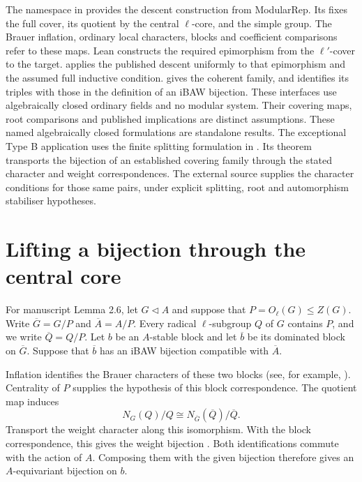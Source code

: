 \begin{implementation}
The  namespace in 
provides the descent construction from ModularRep. Its
 fixes the full cover, its quotient by the
central $\ell$-core, and the simple group. The Brauer inflation,
ordinary local characters, blocks and coefficient
comparisons refer to these maps. Lean constructs the required
epimorphism from the $\ell'$-cover to the target.
 applies the published
descent uniformly to that epimorphism and the assumed full
inductive condition.  gives the
coherent family, and  identifies its
triples with those in the definition of an iBAW bijection. These
interfaces use algebraically closed ordinary fields and no
modular system. Their covering maps, root comparisons and
published implications are distinct assumptions.
These named algebraically closed formulations are standalone results.
The exceptional Type B application uses the finite splitting formulation
in .
Its theorem  transports the bijection
of an established covering family through the stated character and
weight correspondences. The external source supplies the character
conditions for those same pairs, under explicit splitting, root and
automorphism stabiliser hypotheses.
\end{implementation}

\section{Lifting a bijection through the central core}

For manuscript Lemma 2.6, let $G\lhd A$ and suppose that
$P=O_\ell(G)\leq Z(G)$. Write $\overline G=G/P$ and
$\overline A=A/P$. Every radical $\ell$-subgroup $Q$ of $G$
contains $P$, and we write $\overline Q=Q/P$.
Let $b$ be an $A$-stable block and let $\overline b$ be its dominated
block on $\overline G$. Suppose that $\overline b$ has an iBAW
bijection compatible with $\overline A$.

Inflation identifies the Brauer characters of these two blocks
(see, for example, \cite[Theorem~9.10]{Navarro1998}). Centrality of $P$ supplies the
hypothesis of this block correspondence. The quotient map induces
\[
 N_G(Q)/Q\cong N_{\overline G}(\overline Q)/\overline Q.
\]
Transport the weight character along this isomorphism. With the block correspondence, this gives the
weight bijection \cite[Lemma~2.1]{FengLiZhang2019}.
Both identifications commute with the action of $A$. Composing
them with the given bijection therefore gives an $A$-equivariant
bijection on $b$.

